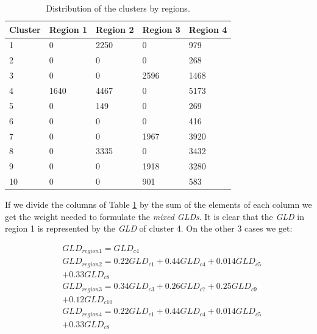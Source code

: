 \begin{table}[H]
\begin{center}
    \begin{tabular}{|l|l|l|l|l|}
    \hline
    \textbf{Cluster} & \textbf{Region 1} &  \textbf{Region 2} &  \textbf{Region 3} &   \textbf{Region 4}  \\ \hline
    1     & 0   		& 2250 & 0 & 979            \\ \hline
    2     & 0   		& 0 & 0 & 268           \\ \hline
    3     & 0      	& 0 & 2596 & 1468       \\ \hline
    4     & 1640	& 4467 & 0 & 5173         \\ \hline
    5     & 0       & 149 & 0 & 269          \\ \hline
    6     & 0     & 0 & 0 & 416           \\ \hline
    7     & 0       & 0 & 1967 & 3920           \\ \hline
    8     & 0     & 3335 & 0 & 3432             \\ \hline
    9     & 0      & 0 & 1918 & 3280       \\ \hline
    10   & 0      & 0 & 901 & 583         \\ \hline
    \end{tabular}
    \caption {Distribution of the clusters by regions.}
    \label{tab:distribution_of_the_clusters_by_regions}
    \end{center}
\end{table}

If we divide the columns of Table \ref{tab:distribution_of_the_clusters_by_regions} by the sum of the elements of each column we get the weight needed to formulate the \textit{mixed GLDs}. It is clear that the \textit{GLD} in region 1 is represented by the \textit{GLD} of cluster 4. On the other 3 cases we get:

\begin{equation*}\label{eq:pareto mle2}
  \begin{aligned}
& GLD_{region1} = GLD_{c4} \\
& GLD_{region2} = 0.22GLD_{c1} + 0.44GLD_{c4} + 0.014GLD_{c5} \\
& + 0.33GLD_{c8} \\
& GLD_{region3} = 0.34GLD_{c3} + 0.26GLD_{c7} + 0.25GLD_{c9} \\
& + 0.12GLD_{c10} \\
& GLD_{region4} = 0.22GLD_{c1} + 0.44GLD_{c4} + 0.014GLD_{c5} \\ 
& + 0.33GLD_{c8}
\end{aligned}
\end{equation*}

